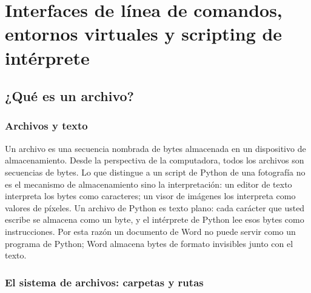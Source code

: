 

\chapter{Interfaces de línea de comandos, entornos virtuales
         y scripting de intérprete}
\label{ch:cli-scripting}

\section{¿Qué es un archivo?}
\label{sec:what-is-a-file}

\subsection{Archivos y texto}

Un archivo es una secuencia nombrada de bytes almacenada en un dispositivo de
almacenamiento. Desde la perspectiva de la computadora, todos los archivos son
secuencias de bytes. Lo que distingue a un script de Python de una fotografía
no es el mecanismo de almacenamiento sino la interpretación: un editor de
texto interpreta los bytes como caracteres; un visor de imágenes los
interpreta como valores de píxeles. Un archivo de Python es texto plano: cada
carácter que usted escribe se almacena como un byte, y el intérprete de
Python lee esos bytes como instrucciones. Por esta razón un documento de Word
no puede servir como un programa de Python; Word almacena bytes de formato
invisibles junto con el texto.

\subsection{El sistema de archivos: carpetas y rutas}

